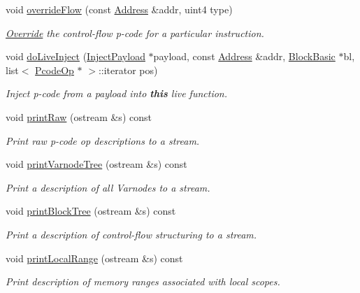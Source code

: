 \begin{DoxyCompactItemize}
void \mbox{\hyperlink{class_funcdata_aafb83719ca201b5d57283058e2bcadee}{override\+Flow}} (const \mbox{\hyperlink{class_address}{Address}} \&addr, uint4 type)
\begin{DoxyCompactList}\small\item\em \mbox{\hyperlink{class_override}{Override}} the control-\/flow p-\/code for a particular instruction. \end{DoxyCompactList}\item 
void \mbox{\hyperlink{class_funcdata_adb1dd79d78141f89d374e570de21d690}{do\+Live\+Inject}} (\mbox{\hyperlink{class_inject_payload}{Inject\+Payload}} $\ast$payload, const \mbox{\hyperlink{class_address}{Address}} \&addr, \mbox{\hyperlink{class_block_basic}{Block\+Basic}} $\ast$bl, list$<$ \mbox{\hyperlink{class_pcode_op}{Pcode\+Op}} $\ast$ $>$\+::iterator pos)
\begin{DoxyCompactList}\small\item\em Inject p-\/code from a {\itshape payload} into {\bfseries{this}} live function. \end{DoxyCompactList}\item 
void \mbox{\hyperlink{class_funcdata_a9a3cdbf385c382c10fc5b48f5842b418}{print\+Raw}} (ostream \&s) const
\begin{DoxyCompactList}\small\item\em Print raw p-\/code op descriptions to a stream. \end{DoxyCompactList}\item 
void \mbox{\hyperlink{class_funcdata_ac150948163b641a4d138ef82bf213f4e}{print\+Varnode\+Tree}} (ostream \&s) const
\begin{DoxyCompactList}\small\item\em Print a description of all Varnodes to a stream. \end{DoxyCompactList}\item 
void \mbox{\hyperlink{class_funcdata_a8c86861b22f4beb1cac5ab3ab43db6ae}{print\+Block\+Tree}} (ostream \&s) const
\begin{DoxyCompactList}\small\item\em Print a description of control-\/flow structuring to a stream. \end{DoxyCompactList}\item 
void \mbox{\hyperlink{class_funcdata_a2b52d8ec8b53529b02881977971067ce}{print\+Local\+Range}} (ostream \&s) const
\begin{DoxyCompactList}\small\item\em Print description of memory ranges associated with local scopes. \end{DoxyCompactList}\item 

\end{DoxyCompactItemize}
